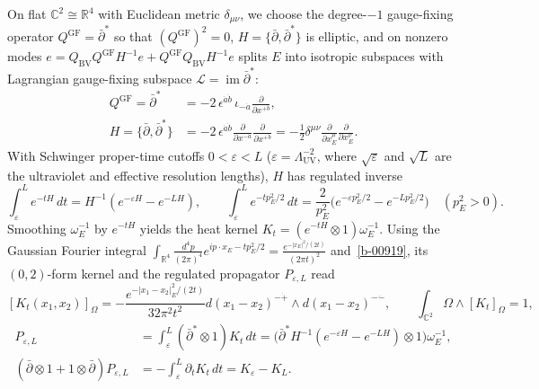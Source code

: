 \documentclass[11pt]{article}
\numberwithin{equation}{section}
\numberwithin{figure}{section}
\numberwithin{table}{section}
\begin{document}
On flat $\mathbb C^2\cong\mathbb R^4$ with Euclidean metric $\delta_{\mu\nu}$, we choose the degree-$-1$ gauge-fixing operator $Q^{\mathrm{GF}}=\bar\partial^*$ so that $(Q^{\mathrm{GF}})^2=0$, $H=\{\bar\partial,\bar\partial^*\}$ is elliptic, and on nonzero modes $e=Q_{\mathrm{BV}}Q^{\mathrm{GF}}H^{-1}e+Q^{\mathrm{GF}}Q_{\mathrm{BV}}H^{-1}e$ splits $E$ into isotropic subspaces with Lagrangian gauge-fixing subspace $\mathcal L=\operatorname{im}\bar\partial^*$:
\begin{equation}\label{eq-dbar-star}
\begin{aligned}
Q^{\mathrm{GF}}=\bar\partial^*
&=-2\,\epsilon^{\dot a\dot b}\,\iota_{-\dot a}
\frac{\partial}{\partial x^{+\dot b}},\\
H=\{\bar\partial,\bar\partial^*\}
&=-2\,\epsilon^{\dot a\dot b}
\frac{\partial}{\partial x^{-\dot a}}
\frac{\partial}{\partial x^{+\dot b}}
=-\frac12\delta^{\mu\nu}
\frac{\partial}{\partial x_E^\mu}
\frac{\partial}{\partial x_E^\nu}.
\end{aligned}
\end{equation}
With Schwinger proper-time cutoffs $0<\varepsilon<L$ ($\varepsilon=\Lambda_{\mathrm{UV}}^{-2}$, where $\sqrt\varepsilon$ and $\sqrt L$ are the ultraviolet and effective resolution lengths), $H$ has regulated inverse
\begin{equation}\label{eq-C-proper-time-inverse}
\int_\varepsilon^L e^{-tH}\,dt
=H^{-1}(e^{-\varepsilon H}-e^{-LH}),\qquad
\int_\varepsilon^L e^{-tp_E^2/2}\,dt
=\frac{2}{p_E^2}\bigl(e^{-\varepsilon p_E^2/2}-e^{-Lp_E^2/2}\bigr)\quad(p_E^2>0).
\end{equation}
Smoothing $\omega_E^{-1}$ by $e^{-tH}$ yields the heat kernel $K_t=(e^{-tH}\otimes1)\omega_E^{-1}$. Using the Gaussian Fourier integral $\int_{\mathbb R^4}\frac{d^4p}{(2\pi)^4}e^{ip\cdot x_E-tp_E^2/2}=\frac{e^{-|x_E|^2/(2t)}}{(2\pi t)^2}$ and~\eqref{b-00919}, its $(0,2)$-form kernel and the regulated propagator $P_{\varepsilon,L}$ read~\cite{Costello,Wang}
\begin{equation}\label{eq-C-heat-spatial}
[K_t(x_1,x_2)]_\Omega
=-\frac{e^{-|x_1-x_2|_E^2/(2t)}}{32\pi^2t^2}
 d(x_1-x_2)^{-\dot+}\wedge d(x_1-x_2)^{-\dot-},
\qquad\int_{\mathbb C^2}\Omega\wedge[K_t]_\Omega=1,
\end{equation}
\begin{equation}\label{eq-C-heat-homotopy}
\begin{aligned}
P_{\varepsilon,L}
&=\int_\varepsilon^L(\bar\partial^*\otimes1)K_t\,dt
=\bigl(\bar\partial^*H^{-1}(e^{-\varepsilon H}-e^{-LH})\otimes1\bigr)\omega_E^{-1},\\
(\bar\partial\otimes1+1\otimes\bar\partial)P_{\varepsilon,L}
&=-\int_\varepsilon^L\partial_tK_t\,dt
=K_\varepsilon-K_L.
\end{aligned}
\end{equation}
\end{document}
